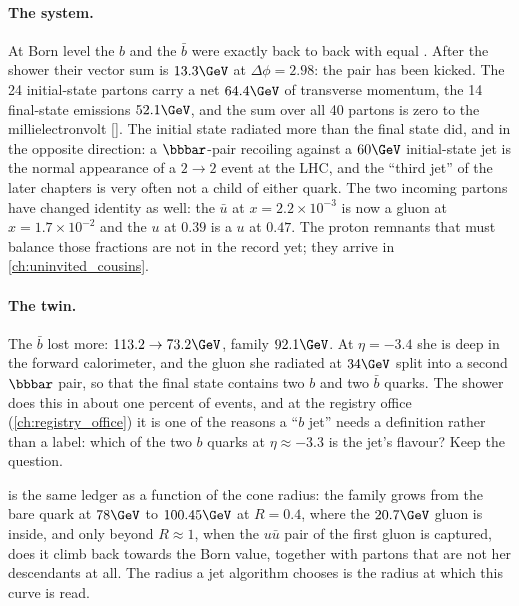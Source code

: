 \paragraph{The system.} At Born level the $b$ and the $\bar b$ were exactly
back to back with equal \pt. After the shower their vector sum is
$13.3\GeV$ at $\Delta\phi=2.98$: the pair has been kicked. The 24
initial-state partons carry a net $64.4\GeV$ of transverse momentum, the 14
final-state emissions $52.1\GeV$, and the sum over all 40 partons is zero to
the millielectronvolt []. The initial state radiated
more than the final state did, and in the opposite direction: a
$\bbbar$-pair recoiling against a $60\GeV$ initial-state jet is the
normal appearance of a $2\to2$ event at the LHC, and the ``third jet'' of
the later chapters is very often not a child of either quark. The two
incoming partons have changed identity as well: the $\bar u$ at
$x=2.2\times10^{-3}$ is now a gluon at $x=1.7\times10^{-2}$ and the $u$ at
$0.39$ is a $u$ at $0.47$. The proton remnants that must balance those
fractions are not in the record yet; they arrive in
\cref{ch:uninvited_cousins}.

\paragraph{The twin.} The $\bar b$ lost more: $113.2\to73.2\GeV$, family
$92.1\GeV$. At $\eta=-3.4$ she is deep in the forward calorimeter, and the
gluon she radiated at $34\GeV$ split into a second $\bbbar$ pair,
so that the final state contains two $b$ and two $\bar b$ quarks. The
shower does this in about one percent of events, and at the registry office
(\cref{ch:registry_office}) it is one of the reasons a ``$b$ jet'' needs a
definition rather than a label: which of the two $b$ quarks at
$\eta\approx-3.3$ is the jet's flavour? Keep the question.

 is the same ledger as a function of
the cone radius: the family grows from the bare quark at $78\GeV$ to
$100.45\GeV$ at $R=0.4$, where the $20.7\GeV$ gluon is inside, and only
beyond $R\approx1$, when the $u\bar u$ pair of the first gluon is captured,
does it climb back towards the Born value, together with partons that are
not her descendants at all. The radius a jet algorithm chooses is the
radius at which this curve is read.

